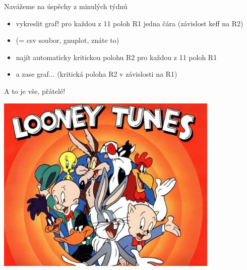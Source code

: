 \documentclass{beamer}
\begin{document}
\begin{frame}{Navážeme na úspěchy z minulých týdnů}
  \begin{itemize}
    \item vykreslit graf! pro každou z 11 poloh R1 jedna čára (závislost keff na R2)
    \item (= csv soubor, gnuplot, znáte to)
    \item najít automaticky kritickou polohu R2 pro každou z 11 poloh R1
    \item a zase graf... (kritická poloha R2 v závislosti na R1)
  \end{itemize}
\end{frame}

\begin{frame}{A to je vše, přátelé!}
  \begin{center}
    \includegraphics[width=0.8\textwidth]{looney_tunes}
  \end{center}
\end{frame}
\end{document}
